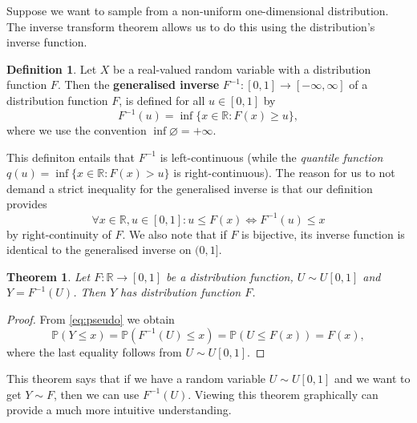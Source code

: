 \documentclass[
]{book}
\newtheorem{theorem}{Theorem}[chapter]
\theoremstyle{definition}
\newtheorem{definition}{Definition}[chapter]
\theoremstyle{definition}
\theoremstyle{definition}
\theoremstyle{definition}
\theoremstyle{remark}
\begin{document}
Suppose we want to sample from a non-uniform one-dimensional distribution. The inverse transform theorem allows us to do this using the distribution's inverse function.

\begin{definition}
Let \(X\) be a real-valued random variable with a distribution function \(F\). Then the \textbf{generalised inverse} \(F^{-1}\colon [0,1] \to [-\infty,\infty]\) of a distribution function \(F\), is defined for all \(u \in [0, 1]\) by
\[
F^{-1}(u) = \inf\{x \in\mathbb{R} : F(x) \geq u\},
\]
where we use the convention \(\inf \varnothing = +\infty\).
\end{definition}

This definiton entails that \(F^{-1}\) is left-continuous (while the \emph{quantile function} \(q(u) = \inf\{x \in \mathbb{R}: F(x) > u\}\) is right-continuous). The reason for us to not demand a strict inequality for the generalised inverse is that our definition provides
\begin{equation}
\label{eq:pseudo}
\forall x \in \mathbb{R}, u \in [0,1]: u \leq F(x) \iff F^{-1}(u) \leq x
\end{equation}
by right-continuity of \(F\). We also note that if \(F\) is bijective, its inverse function is identical to the generalised inverse on \((0,1]\).

\begin{theorem}
Let \(F\colon \mathbb{R} \rightarrow [0, 1]\) be a distribution function, \(U \sim U[0, 1]\) and \(Y = F^{-1}(U)\). Then \(Y\) has distribution function \(F\).
\end{theorem}

\begin{proof}
From \eqref{eq:pseudo} we obtain
\[
\mathbb{P}(Y \leq x) = \mathbb{P}(F^{-1}(U) \leq x) = \mathbb{P}(U \leq F(x)) = F(x),
\]
where the last equality follows from \(U \sim U[0, 1]\).
\end{proof}

This theorem says that if we have a random variable \(U \sim U[0, 1]\) and we want to get \(Y \sim F\), then we can use \(F^{-1}(U)\). Viewing this theorem graphically can provide a much more intuitive understanding.
\end{document}
